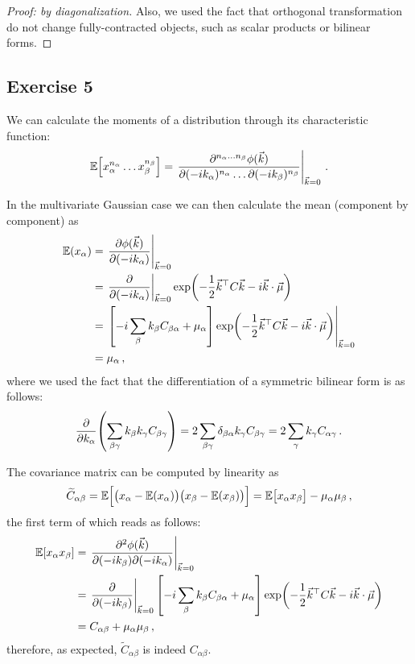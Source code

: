 \documentclass[main.tex]{subfiles}
\begin{document}
\begin{proof}[Proof: by diagonalization]
Also, we used the fact that orthogonal transformation do not change fully-contracted objects, such as scalar products or bilinear forms.
\end{proof}

\subsection{Exercise 5}

We can calculate the moments of a distribution through its characteristic function: 
%
\begin{align}
\mathbb{E} \qty[x_\alpha^{n_\alpha } \dots x_\beta^{n_\beta }]
= \eval{\frac{\partial^{n_\alpha \dots n_\beta } \phi (\vec{k})}{\partial(- i k_\alpha )^{n_\alpha } \dots \partial(-i k_\beta )^{n_\beta }}}_{\vec{k} = 0}
\,.
\end{align}

In the multivariate Gaussian case we can then calculate the mean (component by component) as 
%
\begin{align}
\mathbb{E}(x_\alpha ) &= \eval{\pdv{\phi (\vec{k})}{(-i k_\alpha )}}_{\vec{k} = 0}  \\
&= \eval{\pdv{}{(-i k_\alpha )}}_{\vec{k} = 0}
\exp(- \frac{1}{2} \vec{k}^{\top} C \vec{k} - i \vec{k} \cdot \vec{\mu })  \\
&= \eval{\qty[- i \sum_\beta  k_\beta  C_{\beta  \alpha } + \mu _\alpha ] \exp(- \frac{1}{2} \vec{k}^{\top} C \vec{k} - i \vec{k} \cdot \vec{\mu })}_{\vec{k} = 0}  \\
&= \mu _\alpha 
\,,
\end{align}
%
where we used the fact that the differentiation of a symmetric bilinear form is as follows: 
%
\begin{align}
\pdv{}{k_\alpha } \qty(\sum _{\beta \gamma } k_\beta k_\gamma C_{\beta \gamma }) = 2 \sum _{\beta \gamma } \delta_{\beta \alpha } k_\gamma C_{\beta \gamma } = 2 \sum_{\gamma } k_\gamma C_{\alpha \gamma }
\,.
\end{align}

The covariance matrix can be computed by linearity as
%
\begin{align}
\widetilde{C}_{\alpha \beta } = \mathbb{E}\qty[\qty(x_ \alpha - \mathbb{E}(x_\alpha )) \qty(x_\beta - \mathbb{E}(x_\beta ))] 
= \mathbb{E}\qty[x_\alpha  x_\beta ] - \mu _\alpha \mu _\beta 
\,,
\end{align}
%
the first term of which reads as follows: 
%
\begin{align}
\mathbb{E}[x_\alpha x_\beta ] &= \eval{\pdv[2]{\phi (\vec{k})}{(-i k_\beta  )}{(-i k_\alpha  )}}_{\vec{k} = 0}  \\
&= \eval{\pdv{}{(-i k_\beta )}}_{\vec{k} = 0} \qty[-i \sum _{\beta } k_\beta C_{\beta \alpha } + \mu _\alpha ] \exp(- \frac{1}{2} \vec{k}^{\top} C \vec{k} - i \vec{k} \cdot \vec{\mu })  \\
&= C_{\alpha \beta } + \mu _\alpha \mu _\beta 
\,,
\end{align}
%
therefore, as expected, \(\widetilde{C}_{\alpha \beta }\) is indeed \(C_{\alpha \beta }\). 
\end{document}
